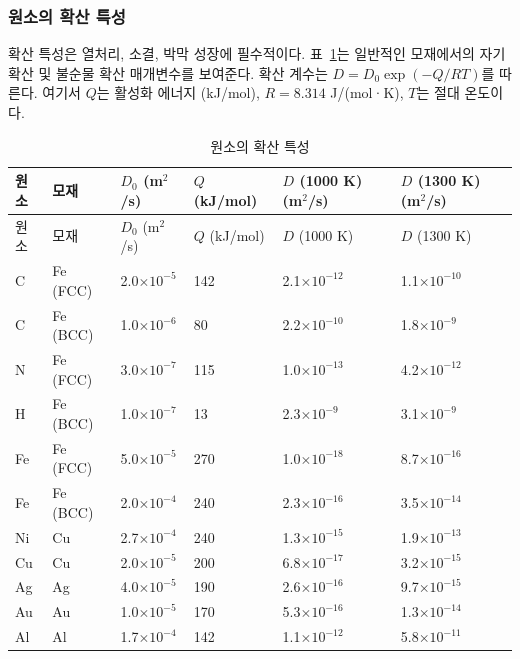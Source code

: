 \documentclass[12pt,a4paper]{article}
\begin{document}
	\subsubsection{원소의 확산 특성}
	\label{subsec:diffusion-properties-func}
	
	확산 특성은 열처리, 소결, 박막 성장에 필수적이다. 표~\ref{tab:diffusion-properties-func}는 일반적인 모재에서의 자기 확산 및 불순물 확산 매개변수를 보여준다. 확산 계수는 \(D = D_0 \exp(-Q/RT)\)를 따른다. 여기서 \(Q\)는 활성화 에너지 (kJ/mol), \(R = 8.314\) J/(mol·K), \(T\)는 절대 온도이다.
	
	\begin{longtable}{p{1.2cm}p{1.2cm}p{2.0cm}p{2.5cm}p{2.5cm}p{2.5cm}}
		\caption{원소의 확산 특성} \label{tab:diffusion-properties-func} \\
		\toprule
		원소 & 모재 & \(D_0\) (m\(^2\)/s) & \(Q\) (kJ/mol) & \(D\) (1000 K) (m\(^2\)/s) & \(D\) (1300 K) (m\(^2\)/s) \\
		\midrule
		\endfirsthead
		\toprule
		원소 & 모재 & \(D_0\) (m\(^2\)/s) & \(Q\) (kJ/mol) & \(D\) (1000 K) & \(D\) (1300 K) \\
		\midrule
		\endhead
		C & Fe (FCC) & 2.0\(\times10^{-5}\) & 142 & 2.1\(\times10^{-12}\) & 1.1\(\times10^{-10}\) \\
		C & Fe (BCC) & 1.0\(\times10^{-6}\) & 80 & 2.2\(\times10^{-10}\) & 1.8\(\times10^{-9}\) \\
		N & Fe (FCC) & 3.0\(\times10^{-7}\) & 115 & 1.0\(\times10^{-13}\) & 4.2\(\times10^{-12}\) \\
		H & Fe (BCC) & 1.0\(\times10^{-7}\) & 13 & 2.3\(\times10^{-9}\) & 3.1\(\times10^{-9}\) \\
		Fe & Fe (FCC) & 5.0\(\times10^{-5}\) & 270 & 1.0\(\times10^{-18}\) & 8.7\(\times10^{-16}\) \\
		Fe & Fe (BCC) & 2.0\(\times10^{-4}\) & 240 & 2.3\(\times10^{-16}\) & 3.5\(\times10^{-14}\) \\
		Ni & Cu & 2.7\(\times10^{-4}\) & 240 & 1.3\(\times10^{-15}\) & 1.9\(\times10^{-13}\) \\
		Cu & Cu & 2.0\(\times10^{-5}\) & 200 & 6.8\(\times10^{-17}\) & 3.2\(\times10^{-15}\) \\
		Ag & Ag & 4.0\(\times10^{-5}\) & 190 & 2.6\(\times10^{-16}\) & 9.7\(\times10^{-15}\) \\
		Au & Au & 1.0\(\times10^{-5}\) & 170 & 5.3\(\times10^{-16}\) & 1.3\(\times10^{-14}\) \\
		Al & Al & 1.7\(\times10^{-4}\) & 142 & 1.1\(\times10^{-12}\) & 5.8\(\times10^{-11}\) \\

\end{longtable}
\end{document}
